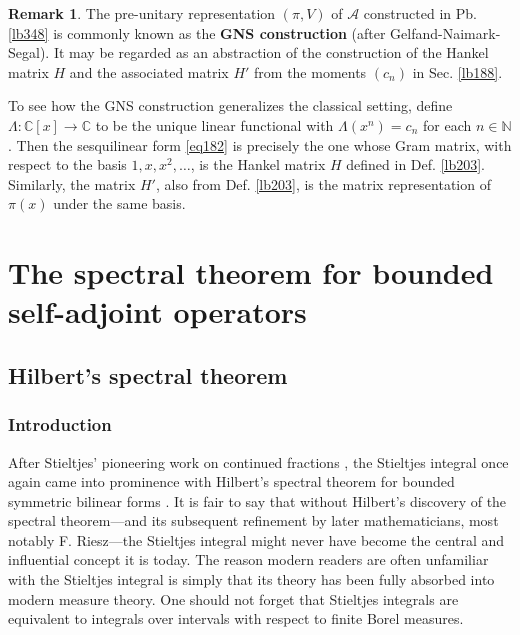 \documentclass[12pt,b5paper,notitlepage]{article}
\theoremstyle{definition}
\newtheorem{rem}[df]{Remark}
\theoremstyle{plain}
\newcommand{\Cbb}{\mathbb C}
\newcommand{\Nbb}{\mathbb N}
\newcommand{\SA}{\mathscr A}
\newcommand{\hqed}{\hfill\qedsymbol}
\numberwithin{equation}{section}
\begin{document}
\begin{rem}\label{lb349}
The pre-unitary representation $(\pi,V)$ of $\SA$ constructed in Pb. \ref{lb348} is commonly known as the \textbf{GNS construction}  (after Gelfand-Naimark-Segal). It may be regarded as an abstraction of the construction of the Hankel matrix $H$ and the associated matrix $H'$ from the moments $(c_n)$ in Sec. \ref{lb188}.

To see how the GNS construction generalizes the classical setting, define $\Lambda:\Cbb[x]\rightarrow\Cbb$ to be the unique linear functional with $\Lambda(x^n)=c_n$ for each $n\in\Nbb$. Then the sesquilinear form \eqref{eq182} is precisely the one whose Gram matrix, with respect to the basis $1,x,x^2,\dots$, is the Hankel matrix $H$ defined in Def. \ref{lb203}. Similarly, the matrix $H'$, also from Def. \ref{lb203}, is the matrix representation of $\pi(x)$ under the same basis.  \hqed
\end{rem}











\newpage


\section{The spectral theorem for bounded self-adjoint operators}\label{lb181}



\subsection{Hilbert's spectral theorem}\label{lb442}


\subsubsection{Introduction}

After Stieltjes' pioneering work on continued fractions \cite{Sti94}, the Stieltjes integral once again came into prominence with Hilbert’s spectral theorem for bounded symmetric bilinear forms \cite{Hil06}. It is fair to say that without Hilbert's discovery of the spectral theorem---and its subsequent refinement by later mathematicians, most notably F. Riesz---the Stieltjes integral might never have become the central and influential concept it is today. The reason modern readers are often unfamiliar with the Stieltjes integral is simply that its theory has been fully absorbed into modern measure theory. One should not forget that Stieltjes integrals are equivalent to integrals over intervals with respect to finite Borel measures.
\end{document}
